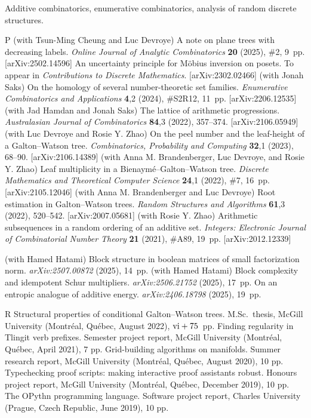 Additive combinatorics, enumerative combinatorics, analysis of random discrete structures.


\begingroup\frenchspacing
{}
\pubbegin P
\papitem (with Tsun-Ming Cheung and Luc Devroye)
A note on plane trees with decreasing labels.
{\sl Online Journal of Analytic Combinatorics}\/ {\bf 20} (2025), \#2, 9~pp.
[arXiv:2502.14596]
\papitem An uncertainty principle for M\"obius inversion on posets.
To appear in {\sl Contributions to Discrete Mathematics}.
[arXiv:2302.02466]
\papitem (with Jonah Saks)
On the homology of several number-theoretic set families.
{\sl Enumerative Combinatorics and Applications}\/ {\bf 4},2 (2024), \#S2R12, 11~pp.
[arXiv:2206.12535]
\papitem (with Jad Hamdan and Jonah Saks)
The lattice of arithmetic progressions.
{\sl Australasian Journal of Combinatorics}\/ {\bf 84},3 (2022), 357--374.
[arXiv:2106.05949]
\papitem (with Luc Devroye and Rosie Y. Zhao)
On the peel number and the leaf-height of a Galton--Watson tree.
{\sl Combinatorics, Probability and Computing}\/ {\bf 32},1 (2023), 68--90.
[arXiv:2106.14389]
\papitem (with Anna M. Brandenberger, Luc Devroye, and Rosie Y. Zhao)
Leaf multiplicity in a Bienaym\'e--Galton--Watson tree. {\sl Discrete Mathematics
and Theoretical Computer Science}\/ {\bf 24},1 (2022), \#7, 16~pp.
[arXiv:2105.12046]
\papitem (with Anna M. Brandenberger and Luc Devroye)
Root estimation in Galton--Watson trees. {\sl Random Structures and Algorithms}\/ {\bf 61},3 (2022), 520--542.
[arXiv:2007.05681]
\papitem (with Rosie Y. Zhao)
Arithmetic subsequences in a random ordering of an additive set.
{\sl Integers: Electronic Journal of Combinatorial Number Theory}\/ {\bf 21} (2021), \#A89, 19~pp.
[arXiv:2012.12339]


\begingroup\frenchspacing\parindent=10pt
\thing (with Hamed Hatami)
Block structure in boolean matrices of small factorization norm.
{\sl arXiv:2507.00872} (2025), 14~pp.
\smallskip
\thing (with Hamed Hatami)
Block complexity and idempotent Schur multipliers.
{\sl arXiv:2506.21752} (2025), 17~pp.
\smallskip
\thing
On an entropic analogue of additive energy.
{\sl arXiv:2406.18798} (2025), 19~pp.
\endgroup

\goodbreak
{}

\pubbegin R
\repitem Structural properties of conditional Galton--Watson trees. M.Sc.~thesis, McGill University
(Montr\'eal, Qu\'ebec, August 2022), $\hbox{\rm vi} + 75$~pp.
\repitem Finding regularity in Tlingit verb prefixes. Semester project report, McGill University
(Montr\'eal, Qu\'ebec, April 2021), 7 pp.
\repitem Grid-building algorithms on manifolds. Summer research report, McGill University (Montr\'eal, Qu\'ebec,
August 2020), 10 pp.
\repitem Typechecking proof scripts: making interactive proof assistants robust.
Honours project report, McGill University (Montr\'eal, Qu\'ebec, December 2019), 10 pp.
\repitem The OPythn programming language. Software project report, Charles University (Prague,
Czech Republic, June 2019), 10 pp.

